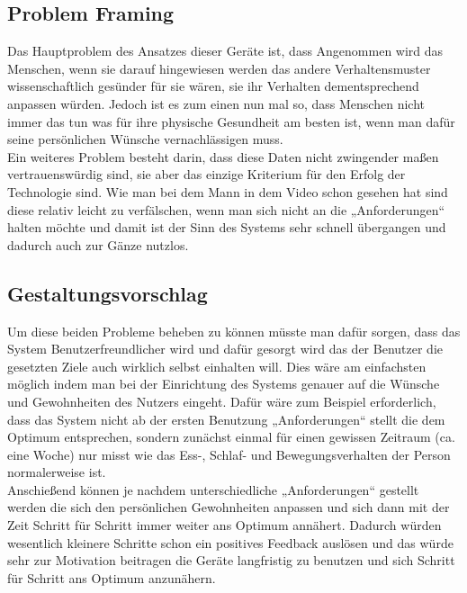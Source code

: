 \subsection{Problem Framing}
Das Hauptproblem des Ansatzes dieser Geräte ist, dass Angenommen wird das Menschen, wenn sie darauf hingewiesen werden das andere Verhaltensmuster wissenschaftlich gesünder für sie wären, sie ihr Verhalten dementsprechend anpassen würden. Jedoch ist es zum einen nun mal so, dass Menschen nicht immer das tun was für ihre physische Gesundheit am besten ist, wenn man dafür seine persönlichen Wünsche vernachlässigen muss. \\
Ein weiteres Problem besteht darin, dass diese Daten nicht zwingender maßen vertrauenswürdig sind, sie aber das einzige Kriterium für den Erfolg der Technologie sind. Wie man bei dem Mann in dem Video schon gesehen hat sind diese relativ leicht zu verfälschen, wenn man sich nicht an die „Anforderungen“ halten möchte und damit ist der Sinn des Systems sehr schnell übergangen und dadurch auch zur Gänze nutzlos. 

\subsection{Gestaltungsvorschlag}
Um diese beiden Probleme beheben zu können müsste man dafür sorgen, dass das System Benutzerfreundlicher wird und dafür gesorgt wird das der Benutzer die gesetzten Ziele auch wirklich selbst einhalten will.  
Dies wäre am einfachsten möglich indem man bei der Einrichtung des Systems genauer auf die Wünsche und Gewohnheiten des Nutzers eingeht. Dafür wäre zum Beispiel erforderlich, dass das System nicht ab der ersten Benutzung „Anforderungen“ stellt die dem Optimum entsprechen, sondern zunächst einmal für einen gewissen Zeitraum (ca. eine Woche) nur misst wie das Ess-, Schlaf- und Bewegungsverhalten der Person normalerweise ist. \\
Anschießend können je nachdem unterschiedliche „Anforderungen“ gestellt werden die sich den persönlichen Gewohnheiten anpassen und sich dann mit der Zeit Schritt für Schritt immer weiter ans Optimum annähert. Dadurch würden wesentlich kleinere Schritte schon ein positives Feedback auslösen und das würde sehr zur Motivation beitragen die Geräte langfristig zu benutzen und sich Schritt für Schritt ans Optimum anzunähern. 